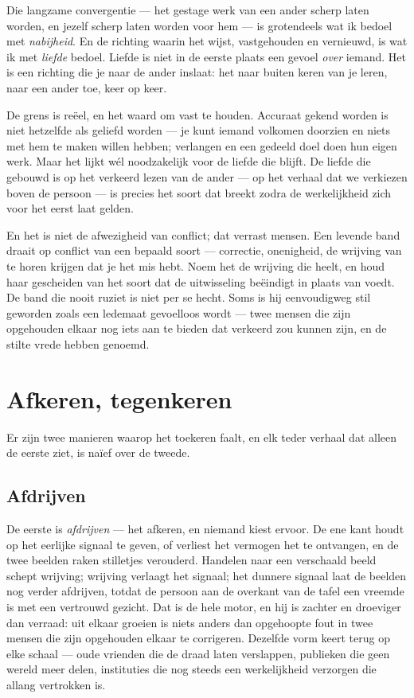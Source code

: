 \documentclass[12pt, a4paper]{article}
\begin{document}
Die langzame convergentie — het gestage werk van een ander scherp laten worden, en jezelf scherp laten worden voor hem — is grotendeels wat ik bedoel met \textit{nabijheid}. En de richting waarin het wijst, vastgehouden en vernieuwd, is wat ik met \textit{liefde} bedoel. Liefde is niet in de eerste plaats een gevoel \textit{over} iemand. Het is een richting die je naar de ander inslaat: het naar buiten keren van je leren, naar een ander toe, keer op keer.

De grens is reëel, en het waard om vast te houden. Accuraat gekend worden is niet hetzelfde als geliefd worden — je kunt iemand volkomen doorzien en niets met hem te maken willen hebben; verlangen en een gedeeld doel doen hun eigen werk. Maar het lijkt wél noodzakelijk voor de liefde die blijft. De liefde die gebouwd is op het verkeerd lezen van de ander — op het verhaal dat we verkiezen boven de persoon — is precies het soort dat breekt zodra de werkelijkheid zich voor het eerst laat gelden.

En het is niet de afwezigheid van conflict; dat verrast mensen. Een levende band draait op conflict van een bepaald soort — correctie, onenigheid, de wrijving van te horen krijgen dat je het mis hebt. Noem het de wrijving die heelt, en houd haar gescheiden van het soort dat de uitwisseling beëindigt in plaats van voedt. De band die nooit ruziet is niet per se hecht. Soms is hij eenvoudigweg stil geworden zoals een ledemaat gevoelloos wordt — twee mensen die zijn opgehouden elkaar nog iets aan te bieden dat verkeerd zou kunnen zijn, en de stilte vrede hebben genoemd.

\section*{Afkeren, tegenkeren}
Er zijn twee manieren waarop het toekeren faalt, en elk teder verhaal dat alleen de eerste ziet, is naïef over de tweede.

\subsection*{Afdrijven}
De eerste is \textit{afdrijven} — het afkeren, en niemand kiest ervoor. De ene kant houdt op het eerlijke signaal te geven, of verliest het vermogen het te ontvangen, en de twee beelden raken stilletjes verouderd. Handelen naar een verschaald beeld schept wrijving; wrijving verlaagt het signaal; het dunnere signaal laat de beelden nog verder afdrijven, totdat de persoon aan de overkant van de tafel een vreemde is met een vertrouwd gezicht. Dat is de hele motor, en hij is zachter en droeviger dan verraad: uit elkaar groeien is niets anders dan opgehoopte fout in twee mensen die zijn opgehouden elkaar te corrigeren. Dezelfde vorm keert terug op elke schaal — oude vrienden die de draad laten verslappen, publieken die geen wereld meer delen, instituties die nog steeds een werkelijkheid verzorgen die allang vertrokken is.
\end{document}
